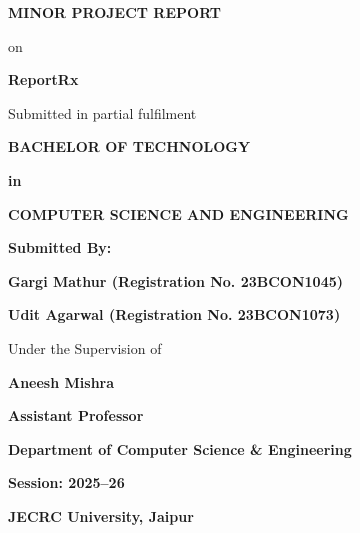 \documentclass[12pt,a4paper]{report}
\begin{document}
\pagestyle{plain}

\begin{titlepage}
    \thispagestyle{empty}
    \vspace*{\fill}
    \begin{center}
        {\fontsize{18pt}{22pt}\selectfont\bfseries MINOR PROJECT REPORT\par}
        \vspace{0.5cm}
        {\Large on\par}
        \vspace{0.5cm}
        {\Huge\bfseries ReportRx\par}
        \vspace{1cm}
        {\Large Submitted in partial fulfilment\par}
        \vspace{0.5cm}
        {\Large\bfseries BACHELOR OF TECHNOLOGY\par}
        {\Large\bfseries in\par}
        {\Large\bfseries COMPUTER SCIENCE AND ENGINEERING\par}

        \vspace{1.5cm}

        {\large\bfseries Submitted By:\par}
        \vspace{0.3cm}
        {\large\bfseries Gargi Mathur (Registration No. 23BCON1045)\par}
        {\large\bfseries Udit Agarwal (Registration No. 23BCON1073)\par}

        \vspace{0.5cm}
        {\large Under the Supervision of\par}
        {\large\bfseries Aneesh Mishra\par}
        {\large\bfseries Assistant Professor\par}

        \vspace{1.5cm}

        {\large\bfseries Department of Computer Science \& Engineering\par}
        {\large\bfseries Session: 2025--26\par}
        {\large\bfseries JECRC University, Jaipur\par}
    \end{center}
    \vspace*{\fill}
    \restoregeometry
\end{titlepage}
\end{document}
